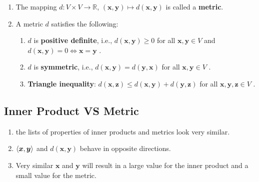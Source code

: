 \begin{enumerate}
    \item 
    \begin{definition}[Metric]
        The mapping $d : V \times V \to \mathbb{R}$, $(\bm{x}, \bm{y}) \mapsto d(\bm{x}, \bm{y})$ is called a \textbf{metric}.
        \hfill \cite{mfml/book/mml/Deisenroth-Faisal-Ong}
    \end{definition}

    \item A metric $d$ satisfies the following:
    \hfill \cite{mfml/book/mml/Deisenroth-Faisal-Ong}
    \begin{enumerate}
        \item $d$ is \textbf{positive definite}, i.e., $d(\bm{x}, \bm{y}) \geq 0$ for all $\bm{x}, \bm{y} \in V$ and $d(\bm{x}, \bm{y}) = 0 \Longleftrightarrow \bm{x} = \bm{y}$ .
        \hfill \cite{mfml/book/mml/Deisenroth-Faisal-Ong}

        \item $d$ is \textbf{symmetric}, i.e., $d(\bm{x}, \bm{y}) = d(\bm{y}, \bm{x})$ for all $\bm{x}, \bm{y} \in V$ .
        \hfill \cite{mfml/book/mml/Deisenroth-Faisal-Ong}

        \item \textbf{Triangle inequality}: $d(\bm{x}, \bm{z}) \leq d(\bm{x}, \bm{y}) + d(\bm{y}, \bm{z})$ for all $\bm{x}, \bm{y}, \bm{z} \in V$ .
        \hfill \cite{mfml/book/mml/Deisenroth-Faisal-Ong}
    \end{enumerate}
\end{enumerate}



\subsection{Inner Product VS Metric}

\begin{enumerate}
    \item the lists of properties of inner products and metrics look very similar. 
    \hfill \cite{mfml/book/mml/Deisenroth-Faisal-Ong}

    \item $\langle\bm{x}, \bm{y}\rangle$ and $d(\bm{x}, \bm{y})$ behave in opposite directions.
    \hfill \cite{mfml/book/mml/Deisenroth-Faisal-Ong}

    \item Very similar $\bm{x}$ and $\bm{y}$ will result in a large value for the inner product and a small value for the metric.
    \hfill \cite{mfml/book/mml/Deisenroth-Faisal-Ong}
\end{enumerate}




